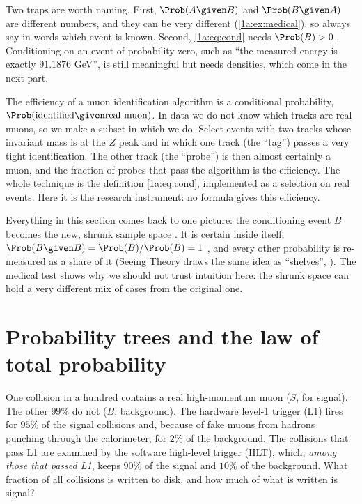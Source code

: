 Two traps are worth naming. First, $\Prob(A\given B)$ and $\Prob(B\given A)$ are
different numbers, and they can be very different (\cref{1a:ex:medical}), so
always say in words which event is known. Second, \eqref{1a:eq:cond} needs
$\Prob(B)>0$. Conditioning on an event of probability zero, such as ``the
measured energy is exactly $91.1876$ GeV'', is still meaningful but needs
densities, which come in the next part.

\begin{inpractice}
The efficiency of a muon identification algorithm is a conditional
probability, $\Prob(\text{identified}\given\text{real muon})$. In data we do not know
which tracks are real muons, so we make a subset in which we do. Select
events with two tracks whose invariant mass is at the $Z$ peak and in which
one track (the ``tag'') passes a very tight identification. The other track
(the ``probe'') is then almost certainly a muon, and the fraction of probes
that pass the algorithm is the efficiency. The whole technique is the
definition \eqref{1a:eq:cond}, implemented as a selection on real events. Here
it is the research instrument: no formula gives this efficiency.
\end{inpractice}

Everything in this section comes back to one picture: the conditioning event
$B$ becomes the new, shrunk sample space . It is
certain inside itself, $\Prob(B\given B)=\Prob(B)/\Prob(B)=1$
, and every other probability is re-measured as a
share of it (Seeing Theory draws the same idea as ``shelves'',
). The medical test shows why we should not trust
intuition here: the shrunk space can hold a very different mix of cases from
the original one.
\section{Probability trees and the law of total probability}
\label{1a:sec:trees}

One collision in a hundred contains a real high-momentum muon ($S$, for
signal). The other $99\%$ do not ($B$, background). The hardware level-1
trigger (L1) fires for $95\%$ of the signal collisions and, because of fake
muons from hadrons punching through the calorimeter, for $2\%$ of the
background. The collisions that pass L1 are examined by the software
high-level trigger (HLT), which, \emph{among those that passed L1}, keeps
$90\%$ of the signal and $10\%$ of the background. What fraction of all
collisions is written to disk, and how much of what is written is signal?

